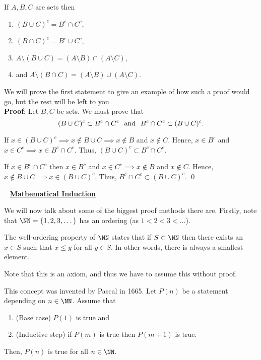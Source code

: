 \begin{theorem}
If $A,B,C$ are sets then
\begin{enumerate}
    \item $(B\cup C)^c = B^c \cap C^c$,
    \item $(B\cap C)^c = B^c \cup C^c$,
    \item $A\setminus (B\cup C) = (A\setminus B) \cap (A\setminus C)$,
    \item and $A\setminus(B\cap C) = (A\setminus B) \cup (A\setminus C)$.
\end{enumerate}
\end{theorem}
We will prove the first statement to give an example of how such a proof would go, but the rest will be left to you.\\ 
\textbf{Proof}: Let $B,C$ be sets. We must prove that 
\[
(B\cup C)^c \subset B^c \cap C^c \hspace{.25cm}\text{and}\hspace{.25cm} B^c \cap C^c \subset (B\cup C)^c.
\]

If $x\in (B\cup C)^c\implies x\notin B\cup C\implies x\notin B$ and $x\notin C$. Hence, $x\in B^c$ and $x\in C^c \implies x\in B^c \cap C^c$. Thus, $(B\cup C)^c \subset B^c \cap C^c$.

If $x\in B^c \cap C^c$ then $x\in B^c$ and $x\in C^c\implies x\notin B$ and $x\notin C$. Hence, $x\notin B\cup C\implies x\in (B\cup C)^c$. Thus, $B^c \cap C^c \subset (B\cup C)^c.$ \qed

~\newline
\noindent\underline{\textbf{Mathematical Induction}}

We will now talk about some of the biggest proof methods there are. Firstly, note that $\NN= \{1,2,3,\dots\}$ has an ordering (as $1<2<3<\dots$). 
\begin{axiom}
The well-ordering property of $\NN$ states that if $S\subset \NN$ then there exists an $x\in S$ such that $x\leq y$ for all $y\in S$. In other words, there is always a smallest element. 
\end{axiom}
Note that this is an axiom, and thus we have to assume this without proof.

\begin{theorem}[Induction]
This concept was invented by Pascal in 1665. Let $P(n)$ be a statement depending on $n\in \NN$. Assume that 
\begin{enumerate}
    \item (Base case) $P(1)$ is true and 
    \item (Inductive step) if $P(m)$ is true then $P(m+1)$ is true.
\end{enumerate}
Then, $P(n)$ is true for all $n\in \NN.$
\end{theorem}

